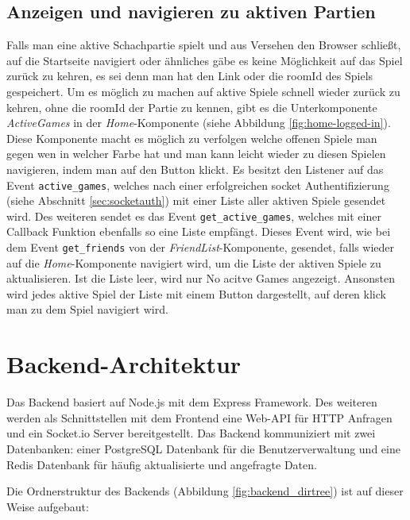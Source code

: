 \subsection{Anzeigen und navigieren zu aktiven Partien}
Falls man eine aktive Schachpartie spielt und aus Versehen den Browser schließt, auf die Startseite navigiert oder ähnliches gäbe es keine Möglichkeit auf das Spiel zurück zu kehren, es sei denn man hat den Link oder die roomId des Spiels gespeichert. Um es möglich zu machen auf aktive Spiele schnell wieder zurück zu kehren, ohne die roomId der Partie zu kennen, gibt es die Unterkomponente \textit{ActiveGames} in der \textit{Home}-Komponente (siehe Abbildung \ref{fig:home-logged-in}). Diese Komponente macht es möglich zu verfolgen welche offenen Spiele man gegen wen in welcher Farbe hat und man kann leicht wieder zu diesen Spielen navigieren, indem man auf den Button klickt.
Es besitzt den Listener auf das Event \verb|active_games|, welches nach einer erfolgreichen socket Authentifizierung (siehe Abschnitt \ref{sec:socketauth}) mit einer Liste aller aktiven Spiele gesendet wird. Des weiteren sendet es das Event \verb|get_active_games|, welches mit einer Callback Funktion ebenfalls so eine Liste empfängt. Dieses Event wird, wie bei dem Event \verb|get_friends| von der \textit{FriendList}-Komponente, gesendet, falls wieder auf die \textit{Home}-Komponente navigiert wird, um die Liste der aktiven Spiele zu aktualisieren.
Ist die Liste leer, wird nur \glqq No acitve Games\grqq{ } angezeigt. Ansonsten wird jedes aktive Spiel der Liste mit einem Button dargestellt, auf deren klick man zu dem Spiel navigiert wird.

        \section{Backend-Architektur}
Das Backend basiert auf Node.js mit dem Express Framework. Des weiteren werden als Schnittstellen mit dem Frontend eine Web-API für HTTP Anfragen und ein Socket.io Server bereitgestellt. Das Backend kommuniziert mit zwei Datenbanken: einer PostgreSQL Datenbank für die Benutzerverwaltung und eine Redis Datenbank für häufig aktualisierte und angefragte Daten.

Die Ordnerstruktur des Backends (Abbildung \ref{fig:backend_dirtree}) ist auf dieser Weise aufgebaut:

